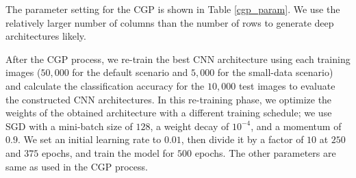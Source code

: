 The parameter setting for the CGP is shown in Table \ref{cgp_param}. We use the relatively larger number of columns than the number of rows to generate deep architectures likely.
 


After the CGP process, we re-train the best CNN architecture using each training images ($50,000$ for the default scenario and $5,000$ for the small-data scenario) and calculate the classification accuracy for the $10,000$ test images to evaluate the constructed CNN architectures.
In this re-training phase, we optimize the weights of the obtained architecture with a different training schedule; we use SGD with a mini-batch size of $128$, a weight decay of $10^{-4}$, and a momentum of $0.9$. We set an initial learning rate to $0.01$, then divide it by a factor of $10$ at $250$ and $375$ epochs, and train the model for $500$ epochs. The other parameters are same as used in the CGP process.



